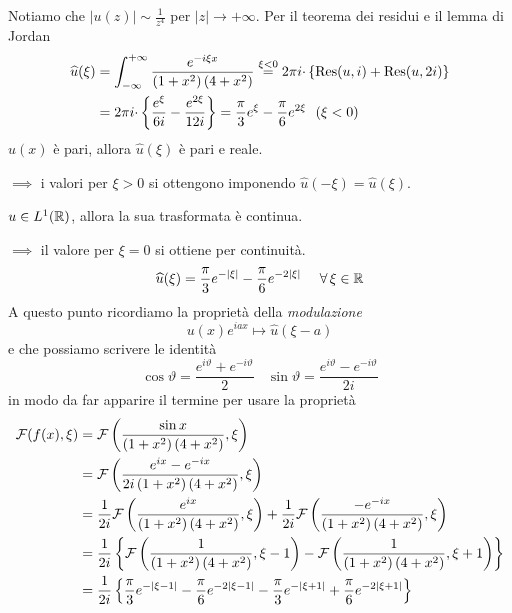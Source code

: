 Notiamo che $| u( z)| \sim \frac{1}{z^{4}}$ per $| z| \rightarrow +\infty $. Per il teorema dei residui e il lemma di Jordan
\begin{equation*}
\begin{aligned}
\widehat{u}( \xi ) & =\int ^{+\infty }_{-\infty }\frac{e^{-i\xi x}}{\left( 1+x^{2}\right)\left( 4+x^{2}\right)}\overset{\xi < 0}{=} 2\pi i\cdotp \{\operatorname{Res} ( u,i) +\operatorname{Res} ( u,2i)\}\\
 & =2\pi i\cdotp \left\{\frac{e^{\xi }}{6i} -\frac{e^{2\xi }}{12i}\right\} =\frac{\pi }{3} e^{\xi } -\frac{\pi }{6} e^{2\xi } \ \ ( \xi < 0)
\end{aligned}
\end{equation*}
$u( x)$ è pari, allora $\hat{u}( \xi )$ è pari e reale.

$\implies $ i valori per $\xi  >0$ si ottengono imponendo $\hat{u}( -\xi ) =\hat{u}( \xi )$.

$u\in L^{1}(\mathbb{R} )$, allora la sua trasformata è continua.

$\implies $ il valore per $\xi =0$ si ottiene per continuità.
\begin{equation*}
\hat{u}( \xi ) =\frac{\pi }{3} e^{-| \xi | } -\frac{\pi }{6} e^{-2| \xi | } \ \ \ \ \forall \xi \in \RR 
\end{equation*}
A questo punto ricordiamo la proprietà della \textit{modulazione}
\begin{equation*}
u( x) e^{iax} \mapsto \hat{u}( \xi -a)
\end{equation*}
e che possiamo scrivere le identità
\begin{equation*}
\cos \vartheta =\frac{e^{i\vartheta } +e^{-i\vartheta }}{2} \ \ \ \ \sin \vartheta =\frac{e^{i\vartheta } -e^{-i\vartheta }}{2i}
\end{equation*}
in modo da far apparire il termine per usare la proprietà
\begin{equation*}
\begin{aligned}
\mathcal{F} ( f( x) ,\xi ) & =\mathcal{F} \left(\frac{\sin x}{\left( 1+x^{2}\right)\left( 4+x^{2}\right)} ,\xi \right)\\
 & =\mathcal{F} \left(\frac{e^{ix} -e^{-ix}}{2i\left( 1+x^{2}\right)\left( 4+x^{2}\right)} ,\xi \right)\\
 & =\frac{1}{2i}\mathcal{F} \left(\frac{e^{ix}}{\left( 1+x^{2}\right)\left( 4+x^{2}\right)} ,\xi \right) +\frac{1}{2i}\mathcal{F} \left(\frac{-e^{-ix}}{\left( 1+x^{2}\right)\left( 4+x^{2}\right)} ,\xi \right)\\
 & =\frac{1}{2i}\left\{\mathcal{F} \left(\frac{1}{\left( 1+x^{2}\right)\left( 4+x^{2}\right)} ,\xi -1\right) -\mathcal{F} \left(\frac{1}{\left( 1+x^{2}\right)\left( 4+x^{2}\right)} ,\xi +1\right)\right\}\\
 & =\frac{1}{2i}\left\{\frac{\pi }{3} e^{-| \xi -1| } -\frac{\pi }{6} e^{-2| \xi -1| } -\frac{\pi }{3} e^{-| \xi +1| } +\frac{\pi }{6} e^{-2| \xi +1| }\right\}
\end{aligned}
\end{equation*}
\Soluzione

